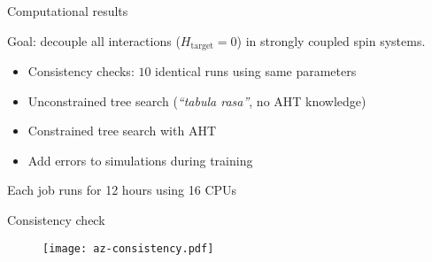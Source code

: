 \documentclass{beamer}
\begin{document}
\begin{frame}{Computational results}


Goal: decouple all interactions ($H_{\text{target}} = 0$) in strongly coupled spin systems.

\begin{itemize}
    \item Consistency checks: $10$ identical runs using same parameters
    \item Unconstrained tree search (\emph{``tabula rasa''}, no AHT knowledge)
    \item Constrained tree search with AHT
    \item Add errors to simulations during training
\end{itemize}

Each job runs for 12 hours using 16 CPUs

\note{

}

\end{frame}



\begin{frame}{Consistency check}

\begin{figure}
\centering
\texttt{[image: az-consistency.pdf]}
\end{figure}


\end{frame}
\end{document}
